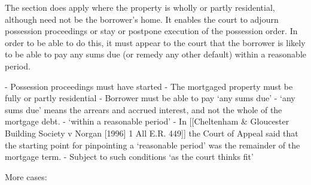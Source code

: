 \documentclass[
]{article}
\newenvironment{Shaded}{}{}
\newcommand{\NormalTok}[1]{#1}
\begin{document}
The section does apply where the property is wholly or partly
residential, although need not be the borrower's home. It enables the
court to adjourn possession proceedings or stay or postpone execution of
the possession order. In order to be able to do this, it must appear to
the court that the borrower is likely to be able to pay any sums due (or
remedy any other default) within a reasonable period.

\begin{Shaded}
\begin{Highlighting}[]
\NormalTok{{-} Possession proceedings must have started}
\NormalTok{{-} The mortgaged property must be fully or partly residential}
\NormalTok{{-} Borrower must be able to pay ‘any sums due’}
\NormalTok{    {-} ‘any sums due’ means the arrears and accrued interest, and not the whole of the mortgage debt.}
\NormalTok{{-} ‘within a reasonable period’}
\NormalTok{    {-} In [[Cheltenham \& Gloucester Building Society v Norgan [1996] 1 All E.R. 449]] the Court of Appeal said that the starting point for pinpointing a ‘reasonable period’ was the remainder of the mortgage term.}
\NormalTok{{-} Subject to such conditions ‘as the court thinks fit’}
\end{Highlighting}
\end{Shaded}

More cases:
\end{document}
